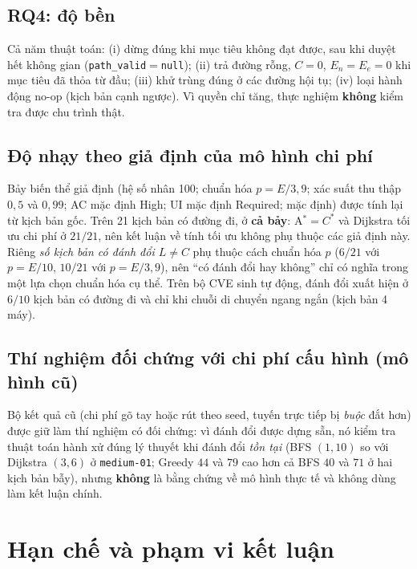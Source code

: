 \documentclass[11pt,a4paper]{article}
\newcommand{\Cs}{C^{*}}
\newcommand{\En}{E_{n}}
\begin{document}
\subsection{RQ4: độ bền}

Cả năm thuật toán: (i) dừng đúng khi mục tiêu không đạt được, sau khi duyệt hết không gian (\texttt{path\_valid}$=$\texttt{null}); (ii) trả đường rỗng, $C=0$, $\En=E_e=0$ khi mục tiêu đã thỏa từ đầu; (iii) khử trùng đúng ở các đường hội tụ; (iv) loại hành động no-op (kịch bản cạnh ngược). Vì quyền chỉ tăng, thực nghiệm \textbf{không} kiểm tra được chu trình thật.

\subsection{Độ nhạy theo giả định của mô hình chi phí}

Bảy biến thể giả định (hệ số nhân 100; chuẩn hóa $p=E/3{,}9$; xác suất thu thập $0{,}5$ và $0{,}99$; AC mặc định High; UI mặc định Required; mặc định) được tính lại từ kịch bản gốc. Trên 21 kịch bản có đường đi, ở \textbf{cả bảy}: A$^{*}=\Cs$ và Dijkstra tối ưu chi phí ở $21/21$, nên kết luận về tính tối ưu không phụ thuộc các giả định này. Riêng \emph{số kịch bản có đánh đổi $L\neq C$} phụ thuộc cách chuẩn hóa $p$ ($6/21$ với $p=E/10$, $10/21$ với $p=E/3{,}9$), nên ``có đánh đổi hay không'' chỉ có nghĩa trong một lựa chọn chuẩn hóa cụ thể. Trên bộ CVE sinh tự động, đánh đổi xuất hiện ở $6/10$ kịch bản có đường đi và chỉ khi chuỗi di chuyển ngang ngắn (kịch bản 4 máy).

\subsection{Thí nghiệm đối chứng với chi phí cấu hình (mô hình cũ)}
\label{sec:legacy}

Bộ kết quả cũ (chi phí gõ tay hoặc rút theo seed, tuyến trực tiếp bị \emph{buộc} đắt hơn) được giữ làm thí nghiệm có đối chứng: vì đánh đổi được dựng sẵn, nó kiểm tra thuật toán hành xử đúng lý thuyết khi đánh đổi \emph{tồn tại} (BFS $(1,10)$ so với Dijkstra $(3,6)$ ở \texttt{medium-01}; Greedy $44$ và $79$ cao hơn cả BFS $40$ và $71$ ở hai kịch bản bẫy), nhưng \textbf{không} là bằng chứng về mô hình thực tế và không dùng làm kết luận chính.

\section{Hạn chế và phạm vi kết luận}
\end{document}
